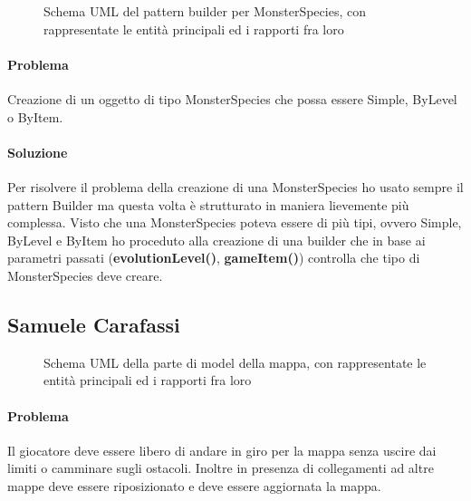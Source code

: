 \begin{figure}[H]
\centering

\caption{Schema UML del pattern builder per MonsterSpecies, con rappresentate le entità principali ed i rapporti fra loro}
\label{img:speciesBuilder}
\end{figure}

\paragraph{Problema}
Creazione di un oggetto di tipo MonsterSpecies che possa essere Simple, ByLevel o ByItem.

\paragraph{Soluzione}
Per risolvere il problema della creazione di una MonsterSpecies ho usato sempre il pattern Builder ma questa volta è strutturato in maniera lievemente più complessa. Visto che una MonsterSpecies poteva essere di più tipi, ovvero Simple, ByLevel e ByItem ho proceduto alla creazione di una builder che in base ai parametri passati (\textbf{evolutionLevel()}, \textbf{gameItem()}) controlla che tipo di MonsterSpecies deve creare.


\subsection*{Samuele Carafassi}

\begin{figure}[H]
\centering

\caption{Schema UML della parte di model della mappa, con rappresentate le entità principali ed i rapporti fra loro}
\label{img:GameMap_UML}
\end{figure}

\paragraph{Problema}
Il giocatore deve essere libero di andare in giro per la mappa senza uscire dai limiti o camminare sugli ostacoli. Inoltre in presenza di collegamenti ad altre mappe deve essere riposizionato e deve essere aggiornata la mappa.

